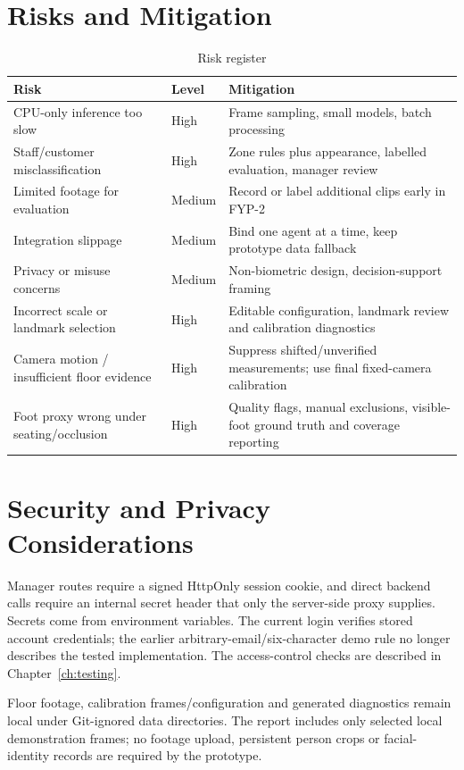 \section{Risks and Mitigation}
\begin{table}[H]
\centering
\caption{Risk register}
\begin{tabular}{P{0.3\textwidth}P{0.1\textwidth}P{0.4\textwidth}}
\toprule
Risk & Level & Mitigation\\
\midrule
CPU-only inference too slow & High & Frame sampling, small models, batch processing\\
Staff/customer misclassification & High & Zone rules plus appearance, labelled evaluation, manager review\\
Limited footage for evaluation & Medium & Record or label additional clips early in FYP-2\\
Integration slippage & Medium & Bind one agent at a time, keep prototype data fallback\\
Privacy or misuse concerns & Medium & Non-biometric design, decision-support framing\\
Incorrect scale or landmark selection & High & Editable configuration, landmark review and calibration diagnostics\\
Camera motion / insufficient floor evidence & High & Suppress shifted/unverified measurements; use final fixed-camera calibration\\
Foot proxy wrong under seating/occlusion & High & Quality flags, manual exclusions, visible-foot ground truth and coverage reporting\\
\bottomrule
\end{tabular}
\end{table}

\section{Security and Privacy Considerations}
Manager routes require a signed HttpOnly session cookie, and direct backend calls require an internal secret header that only the server-side proxy supplies. Secrets come from environment variables. The current login verifies stored account credentials; the earlier arbitrary-email/six-character demo rule no longer describes the tested implementation. The access-control checks are described in Chapter~\ref{ch:testing}.

Floor footage, calibration frames/configuration and generated diagnostics remain local under Git-ignored data directories. The report includes only selected local demonstration frames; no footage upload, persistent person crops or facial-identity records are required by the prototype.

